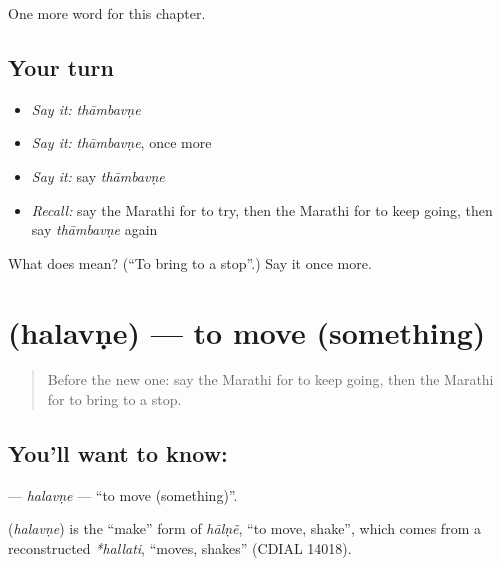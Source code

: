 \begin{grammarlens}[title={What you've built}]
One more word for this chapter.
\end{grammarlens}

\subsection*{Your turn}
\begin{itemize}
\raggedright
  \item \emph{Say it:} \emph{thāmbavṇe}
  \item \emph{Say it:} \emph{thāmbavṇe}, once more
  \item \emph{Say it:} say \emph{thāmbavṇe}
  \item \emph{Recall:} say the Marathi for to try, then the Marathi for to keep going, then say \emph{thāmbavṇe} again
\end{itemize}

\begin{tcolorbox}[breakable,colback=teal!4,colframe=teal!35!black,title={Before you move on}]
What does  mean? (\textquotedblleft{}To bring to a stop\textquotedblright{}.) Say it once more.
\end{tcolorbox}
\section[\texorpdfstring{\mr{हलवणे} (halavṇe)}{हलवणे (halavṇe)}]{ (halavṇe) — to move (something)}

\label{lesson:MR-C251-halavne}



\begin{quote}
Before the new one: say the Marathi for to keep going, then the Marathi for to bring to a stop.
\end{quote}

\subsection*{You'll want to know: }
\textbf{} — \emph{halavṇe} — \textquotedblleft{}to move (something)\textquotedblright{}.

\begin{cousinweb}
\textbf{} (\emph{halavṇe}) is the \textquotedblleft{}make\textquotedblright{} form of \emph{hālṇẽ}, \textquotedblleft{}to move, shake\textquotedblright{}, which comes from a reconstructed \emph{*hallati}, \textquotedblleft{}moves, shakes\textquotedblright{} (CDIAL 14018).
\end{cousinweb}


